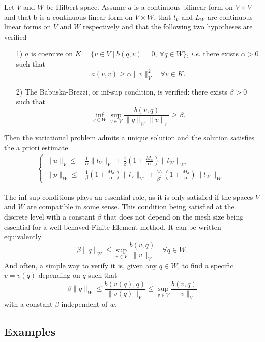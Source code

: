 \begin{theorem} Let $V$ and $W$ be Hilbert space. Assume $a$ is a continuous bilinear form on
$V\times V$ and that b is a continuous linear form on $V\times W$, that  $l_V$ and $L_W$ are continuous linear forms on $V$  and $W$ respectively and that the following two hypotheses are verified
\begin{itemize}
\item[1)]  $a$ is coercive on $K=\{v\in V\; |\; b(q,v)=0,~\forall q\in W\}$, \textit{i.e.} there exists $\alpha>0$ such that
$$a(v,v) \geq \alpha \|v\|^2_V \quad\forall v\in K.$$
\item[2)] The Babuska-Brezzi, or inf-sup condition, is verified:  there exists $\beta>0$ such that
$$ \inf_{q\in W} \sup_{v\in V} \frac{b(v,q)}{\|q\|_W\|v\|_V} \geq \beta.$$
\end{itemize}
Then the variational problem admits a unique solution and the solution satisfies the a priori estimate
\begin{align}
  \left\{ 
  \begin{array}{cl}
    \|u\|_V  \leq & \frac{1}{\alpha} \|l_V\|_{V'} + \frac{1}{\beta}(1+ \frac{M_a}{\alpha})  \|l_W\|_{W'}
    \\
    \|p\|_W  \leq & \frac{1}{\beta}(1+ \frac{M_a}{\alpha})  \|l_V\|_{V'} + \frac{M_a}{\beta^2}(1+ \frac{M_a}{\alpha})  \|l_W\|_{W'}
  \end{array} \right.
\end{align}
\end{theorem}


The inf-sup conditions  plays an essential role, as it is only satisfied if the spaces $V$ and $W$ are compatible in some sense. This condition being satisfied at the discrete level  with a constant $\beta$ that does not depend on the mesh size being essential for a well behaved Finite Element method.  It can be written equivalently
\begin{equation}\label{inf-sup}
\beta \|q\|_W \leq \sup_{v\in V} \frac{b(v,q)}{\|v\|_V} \quad \forall q\in W.
\end{equation}
And often, a simple way to verify it is, given any  $q\in W$, to find a specific $v=v(q)$ depending on $q$ such that
$$\beta \|q\|_W \leq \frac{b(v(q),q)}{\|v(q)\|_V} \leq \sup_{v\in V} \frac{b(v,q)}{\|v\|_V}$$ with a constant $\beta$ independent of $w$.

\subsection{Examples}

